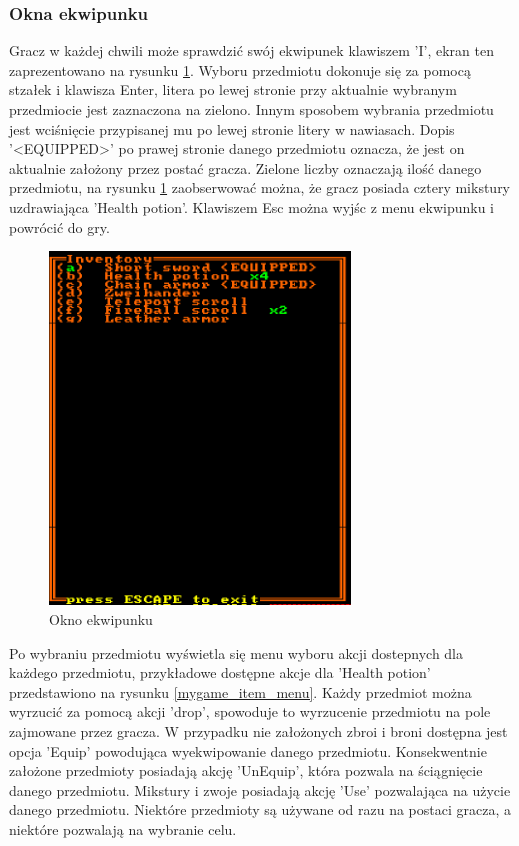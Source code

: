 \documentclass[12pt,twoside]{article}
\begin{document}
\subsubsection{Okna ekwipunku}
Gracz w każdej chwili może sprawdzić swój ekwipunek klawiszem 'I', ekran ten zaprezentowano na rysunku \ref{mygame:inv}. Wyboru przedmiotu dokonuje się za pomocą stzałek i klawisza Enter, litera po lewej stronie przy aktualnie wybranym przedmiocie jest zaznaczona na zielono. Innym sposobem wybrania przedmiotu jest wciśnięcie przypisanej mu po lewej stronie litery w nawiasach. Dopis '<EQUIPPED>' po prawej stronie danego przedmiotu oznacza, że jest on aktualnie założony przez postać gracza. Zielone liczby oznaczają ilość danego przedmiotu, na rysunku \ref{mygame:inv} zaobserwować można, że gracz posiada cztery mikstury uzdrawiająca 'Health potion'. Klawiszem Esc można wyjśc z menu ekwipunku i powrócić do gry.

\FloatBarrier
\begin{figure}[h]
	\centering
	\includegraphics[width=8cm]{images/mygame/inv.png}
	\caption{Okno ekwipunku}
	\label{mygame:inv}
\end{figure}
\FloatBarrier

Po wybraniu przedmiotu wyświetla się menu wyboru akcji dostepnych dla każdego przedmiotu, przykładowe dostępne akcje dla 'Health potion' przedstawiono na rysunku \ref{mygame_item_menu}. Każdy przedmiot można wyrzucić za pomocą akcji 'drop', spowoduje to wyrzucenie przedmiotu na pole zajmowane przez gracza. W przypadku nie założonych zbroi i broni dostępna jest opcja 'Equip' powodująca wyekwipowanie danego przedmiotu. Konsekwentnie założone przedmioty posiadają akcję 'UnEquip', która pozwala na ściągnięcie danego przedmiotu. Mikstury i zwoje posiadają akcję 'Use' pozwalająca na użycie danego przedmiotu. Niektóre przedmioty są używane od razu na postaci gracza, a niektóre pozwalają na wybranie celu.
\end{document}
